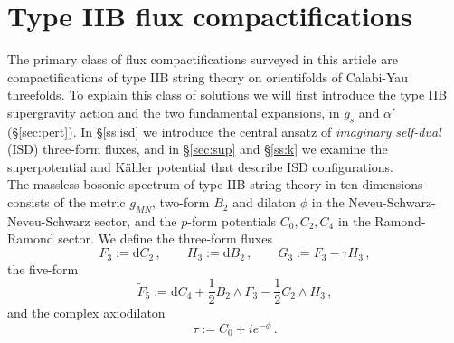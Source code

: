 \documentclass[12pt,a4wide]{article}
\def\d{\mathrm{d}}
\begin{document}
\section{Type IIB flux compactifications}

The primary class of flux compactifications surveyed in this article are compactifications of type IIB string theory on orientifolds of Calabi-Yau threefolds.  To explain this class of solutions we will first introduce the type IIB supergravity action and the two fundamental expansions, in $g_s$ and $\alpha'$ (\S\ref{sec:pert}).  In \S\ref{ss:isd} we introduce the central ansatz of \emph{imaginary self-dual} (ISD) three-form fluxes, and in \S\ref{sec:sup} and \S\ref{ss:k} we examine the superpotential and K\"ahler potential that describe ISD configurations.\\

 

The massless bosonic spectrum of type IIB string theory in ten dimensions consists of the metric $g_{MN}$, two-form $B_2$ and dilaton $\phi$ in the Neveu-Schwarz-Neveu-Schwarz sector, and the $p$-form potentials $C_0, C_2, C_4$ in the Ramond-Ramond sector. 
We define the three-form fluxes 
\begin{equation}
    F_3 := \d C_2\,, \qquad H_3 := \d B_2\,,\qquad G_3 := F_3 - \tau H_3\,, 
\end{equation}
the five-form 
\begin{equation}
    \tilde{F}_5 := \d C_4 + \frac{1}{2} B_2 \wedge F_3 -\frac{1}{2} C_2 \wedge H_3\,,
\end{equation}
and the complex axiodilaton  
\begin{equation}
    \tau:=C_0+ie^{-\phi}\,. 
\end{equation}
\end{document}
